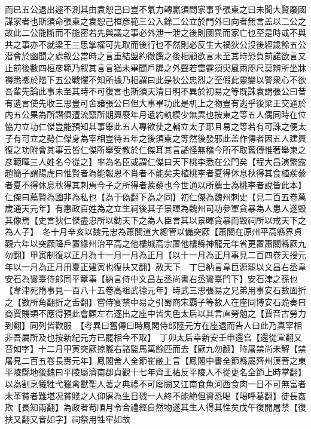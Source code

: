 而已五公退出遽不測其由袁恕己曰豈不氣力轉羸須問家事乎張柬之曰未聞大賢廢國謀家者也斯須命張柬之袁恕己桓彦範三公入餘二公立於門外曰向者無言盖以二公之故此二公能斷而不能密若先與議之事必外泄一泄之後則國異而家亡也至是時或不與共之事亦不就梁王三思掌權可先取而後行也不然則必反生大禍狄公沒後經歲餘五公潜會於幽聞之處叙公當時之言重結盟約徹饌之後相顧欲言未至其時恐負前諾欲言又止前後數四桓彦範乃叙其言言猶未畢聞戶牖之外聲若雷霆須臾風雨咫尺莫辨所坐牀褥悉擲於階下五公戰懼不知所據乃相謂曰此是狄公忠烈之至假此靈變以警衆心不欲吾輩先論此事未至其時不可復言也斯須天清日明不異於初易之等既誅袁謂張公曰昔有遺言使先收三思豈可舍諸張公曰但大事畢功此是机上之物豈有逃乎後梁王交通於内五公果為所譛俱遭流竄所期興廢年月遺約軌模少無異也按東之等五人偶同時在位恊力立功仁傑豈能預知其事舉此五人專欲使之輔立太子耶且易之等若有可誅之便太子有可立之勢仁傑身為宰相豈待五年之後須柬之等然後發邪此盖作傳者因五人建興復之功附會其事云皆仁傑所舉受教於仁傑耳其言譎怪無稽今所不取舊傳惟著舉柬之彦範暉三人姓名今從之】率為名臣或謂仁傑曰天下桃李悉在公門矣【程大昌演繁露趙簡子謂陽虎曰惟賢者為能報恩不肖者不能矣夫植桃李者夏得休息秋得其食植蒺藜者夏不得休息秋得其刺焉今子之所得者蒺藜也今世通以所薦士為桃李者說皆此本】仁傑曰薦賢為國非為私也【為于偽翻下為之同】初仁傑為魏州刺史【見二百五卷萬歲通天元年】有惠政百姓為之立生祠後其子景暉為魏州司功參軍貪暴為人患人遂毁其像焉【史言狄仁傑盡忠所以勸天下之為人臣言其以景暉貪暴而毁祠所以戒天下之為人子】　冬十月辛亥以魏元忠為蕭關道大總管以備突厥【蕭關在原州平高縣界貞觀六年以突厥降戶置緣州治平高之他樓城高宗置他樓縣神龍元年省更置蕭關縣厥九勿翻】甲寅制復以正月為十一月一月為正月【以十一月為正月事見二百四卷天授元年以一月為正月用夏正建寅也復扶又翻】赦天下　丁巳納言韋巨源罷以文昌右丞韋安石為鸞臺侍郎同平章事【納言侍中文昌左丞尚書右丞鸞臺門下】安石津之孫也【韋津死隋事見一百八十五卷高祖武德元年】時武三思張易之兄弟用事安石數面折之【數所角翻折之舌翻】嘗侍宴禁中易之引蜀商宋覇子等數人在座同博安石跪奏曰商賈賤類不應得預此會顧左右逐出之座中皆失色太后以其言直勞勉之【賈音古勞力到翻】同列皆歡服　【考異曰舊傳曰時鳳閣侍郎陸元方在座退而告人曰此乃真宰相非吾屬所及也按新紀元方已罷相今不取】　丁卯太后幸新安壬申還宫【還從宣翻又音如字】十二月甲寅突厥掠隴右諸監馬萬餘匹而去【厥九勿翻】時屠禁尚未解【禁屠見二百五卷長夀元年】鳳閣舍人全節崔融上言【鳳閣中書全節縣屬齊州漢晉之東平陵縣地後魏曰平陵屬濟南郡貞觀十七年齊王祐反平陵人不從更名全節上時掌翻】以為割烹犧牲弋獵禽獸聖人著之典禮不可廢闕又江南食魚河西食肉一日不可無富者未革貧者難堪况貧賤之人仰屠為生日戮一人終不能絶但資恐喝【喝呼葛翻】徒長姦欺【長知兩翻】為政者苟順月令合禮經自然物遂其生人得其性矣戊午復開屠禁【復扶又翻又音如字】祠祭用牲牢如故


